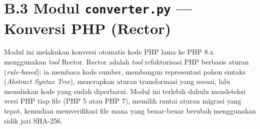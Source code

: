 \section*{B.3 Modul \texttt{converter.py} --- Konversi PHP (Rector)}

Modul ini melakukan konversi otomatis kode PHP lama ke PHP 8.x menggunakan
\textit{tool} Rector. Rector adalah \textit{tool} refaktorisasi PHP berbasis
aturan (\textit{rule-based}): ia membaca kode sumber, membangun representasi
pohon sintaks (\textit{Abstract Syntax Tree}), menerapkan aturan transformasi
yang sesuai, lalu menuliskan kode yang sudah diperbarui. Modul ini terlebih
dahulu mendeteksi versi PHP tiap file (PHP 5 atau PHP 7), memilih rantai aturan
migrasi yang tepat, kemudian memverifikasi file mana yang benar-benar berubah
menggunakan sidik jari SHA-256.

